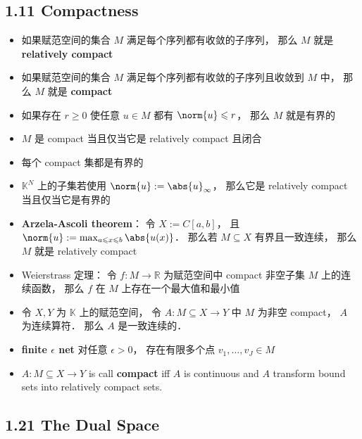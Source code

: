 \subsection{1.11 Compactness}
\begin{itemize}
\item 如果赋范空间的集合 $M$ 满足每个序列都有收敛的子序列， 那么 $M$ 就是 \textbf{relatively compact}

\item 如果赋范空间的集合 $M$ 满足每个序列都有收敛的子序列且收敛到 $M$ 中， 那么 $M$ 就是 \textbf{compact}

\item 如果存在 $r \geqslant 0$ 使任意 $u \in M$ 都有 $\norm{u} \leqslant r$， 那么 $M$ 就是有界的

\item $M$ 是 compact 当且仅当它是 relatively compact 且闭合

\item 每个 compact 集都是有界的

\item $\mathbb K^N$ 上的子集若使用 $\norm{u} := \abs{u}_\infty$， 那么它是 relatively compact 当且仅当它是有界的

\item \textbf{Arzela-Ascoli theorem}： 令 $X := C[a, b]$， 且 $\norm{u} := \max_{a\leqslant x\leqslant b}\abs{u(x)}$． 那么若 $M \subseteq X$ 有界且一致连续， 那么 $M$ 就是 relatively compact

\item Weierstrass 定理： 令 $f: M\to \mathbb R$ 为赋范空间中 compact 非空子集 $M$ 上的连续函数， 那么 $f$ 在 $M$ 上存在一个最大值和最小值

\item 令 $X, Y$ 为 $\mathbb K$ 上的赋范空间， 令 $A: M \subseteq X \to Y$ 中 $M$ 为非空 compact， $A$ 为连续算符． 那么 $A$ 是一致连续的．

\item \textbf{finite $\epsilon$ net} 对任意 $\epsilon > 0$， 存在有限多个点 $v_1, \dots, v_J \in M$ 

\item $A: M \subseteq X \to Y$ is call \textbf{compact} iff $A$ is continuous and $A$ transform bound sets into relatively compact sets.
\end{itemize}


\subsection{1.21 The Dual Space}


